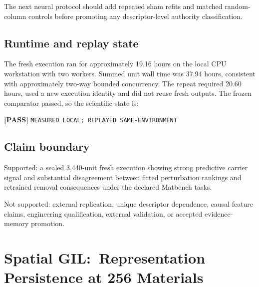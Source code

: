 \documentclass[11pt,a4paper,oneside]{report}
\begin{document}
The next neural protocol should add repeated sham refits and matched random-column
controls before promoting any descriptor-level authority classification.

\section{Runtime and replay state}

The fresh execution ran for approximately 19.16 hours on the local CPU
workstation with two workers. Summed unit wall time was 37.94 hours, consistent
with approximately two-way bounded concurrency. The repeat required 20.60 hours,
used a new execution identity and did not reuse fresh outputs. The frozen
comparator passed, so the scientific state is:

\begin{center}
\textcolor{geoGreen}{\textbf{[PASS]}} \texttt{MEASURED LOCAL; REPLAYED SAME-ENVIRONMENT}
\end{center}

\section{Claim boundary}

Supported: a sealed 3,440-unit fresh execution showing strong predictive carrier
signal and substantial disagreement between fitted perturbation rankings and
retrained removal consequences under the declared Matbench tasks.

Not supported: external replication, unique descriptor
dependence, causal feature claims, engineering qualification, external validation,
or accepted evidence-memory promotion.


\chapter[Spatial GIL Persistence]{Spatial GIL:\ Representation Persistence at 256 Materials}

\begin{center}
\end{center}
\end{document}
